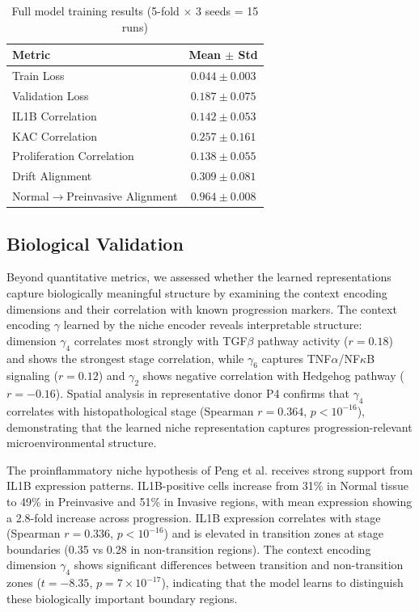 \documentclass[conference]{IEEEtran}
\begin{document}
\begin{table}[h]
\caption{Full model training results (5-fold $\times$ 3 seeds = 15 runs)}
\label{tab:results}
\centering
\begin{tabular}{lc}
\toprule
Metric & Mean $\pm$ Std \\
\midrule
Train Loss & $0.044 \pm 0.003$ \\
Validation Loss & $0.187 \pm 0.075$ \\
IL1B Correlation & $0.142 \pm 0.053$ \\
KAC Correlation & $0.257 \pm 0.161$ \\
Proliferation Correlation & $0.138 \pm 0.055$ \\
Drift Alignment & $0.309 \pm 0.081$ \\
Normal$\to$Preinvasive Alignment & $0.964 \pm 0.008$ \\
\bottomrule
\end{tabular}
\end{table}

\subsection{Biological Validation}

Beyond quantitative metrics, we assessed whether the learned representations capture biologically meaningful structure by examining the context encoding dimensions and their correlation with known progression markers. The context encoding $\gamma$ learned by the niche encoder reveals interpretable structure: dimension $\gamma_4$ correlates most strongly with TGF$\beta$ pathway activity ($r = 0.18$) and shows the strongest stage correlation, while $\gamma_6$ captures TNF$\alpha$/NF$\kappa$B signaling ($r = 0.12$) and $\gamma_2$ shows negative correlation with Hedgehog pathway ($r = -0.16$). Spatial analysis in representative donor P4 confirms that $\gamma_4$ correlates with histopathological stage (Spearman $r = 0.364$, $p < 10^{-16}$), demonstrating that the learned niche representation captures progression-relevant microenvironmental structure.

The proinflammatory niche hypothesis of Peng et al. \cite{Peng2025-xu} receives strong support from IL1B expression patterns. IL1B-positive cells increase from 31\% in Normal tissue to 49\% in Preinvasive and 51\% in Invasive regions, with mean expression showing a 2.8-fold increase across progression. IL1B expression correlates with stage (Spearman $r = 0.336$, $p < 10^{-16}$) and is elevated in transition zones at stage boundaries (0.35 vs 0.28 in non-transition regions). The context encoding dimension $\gamma_4$ shows significant differences between transition and non-transition zones ($t = -8.35$, $p = 7 \times 10^{-17}$), indicating that the model learns to distinguish these biologically important boundary regions.
\end{document}
